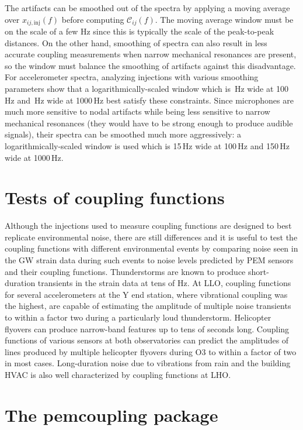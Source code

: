 The artifacts can be smoothed out of the spectra by applying a moving average over $x_{ij,\mathrm{inj}}(f)$ before computing $\mathcal{C}_{ij}(f)$.
The moving average window must be on the scale of a few Hz since this is typically the scale of the peak-to-peak distances.
On the other hand, smoothing of spectra can also result in less accurate coupling measurements when narrow mechanical resonances are present, so the window must balance the smoothing of artifacts against this disadvantage.
For accelerometer spectra, analyzing injections with various smoothing parameters show that a logarithmically-scaled window which is \XX\,Hz wide at 100\,Hz and \XX\,Hz wide at 1000\,Hz best satisfy these constraints.
Since microphones are much more sensitive to nodal artifacts while being less sensitive to narrow mechanical resonances (they would have to be strong enough to produce audible signals), their spectra can be smoothed much more aggressively: a logarithmically-scaled window is used which is 15\,Hz wide at 100\,Hz and 150\,Hz wide at 1000\,Hz.

\section{Tests of coupling functions}

Although the injections used to measure coupling functions are designed to best replicate environmental noise, there are still differences and it is useful to test the coupling functions with different environmental events by comparing noise seen in the \ac{GW} strain data during such events to noise levels predicted by PEM sensors and their coupling functions.
Thunderstorms are known to produce short-duration transients in the strain data at tens of Hz.
At \ac{LLO}, coupling functions for several accelerometers at the Y end station, where vibrational coupling was the highest, are capable of estimating the amplitude of multiple noise transients to within a factor two during a particularly loud thunderstorm.%
Helicopter flyovers can produce narrow-band features up to tens of seconds long.
Coupling functions of various sensors at both observatories can predict the amplitudes of lines produced by multiple helicopter flyovers during O3 to within a factor of two in most cases.%
Long-duration noise due to vibrations from rain and the building \ac{HVAC} is also well characterized by coupling functions at \ac{LHO}.%

\section{The {\selectfont pemcoupling}\xspace package}

